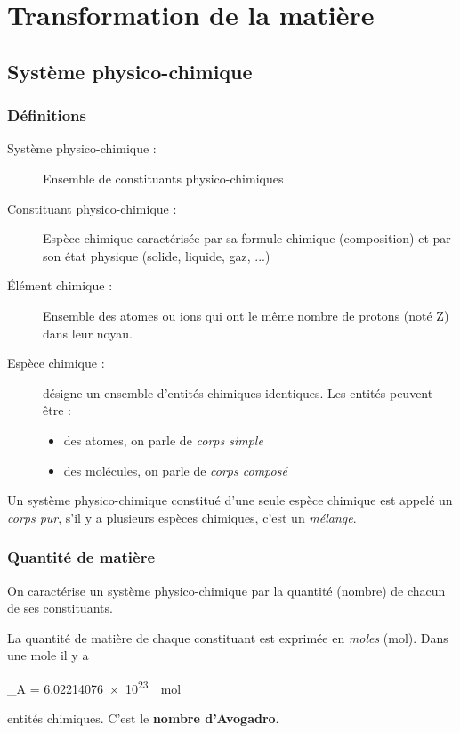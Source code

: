 \documentclass[MPSI]{cours}
\begin{document}
\setcounter{chapter}{2}
\chapter{Transformation de la matière}
\label{sub:transformation_de_la_matière}

\section{Système physico-chimique}%
\label{sec:systeme_physico_chimique}

\subsection{Définitions}%
\label{sub:definitions}

\begin{description}
  \item[Système physico-chimique : ] Ensemble de constituants physico-chimiques
  \item[Constituant physico-chimique : ] Espèce chimique caractérisée par sa formule chimique (composition) et par son état physique (solide, liquide, gaz, ...)
  \item[Élément chimique : ] Ensemble des atomes ou ions qui ont le même nombre de protons (noté Z) dans leur noyau.
  \item[Espèce chimique : ] désigne un ensemble d'entités chimiques identiques. Les entités peuvent être :
  \begin{itemize}
    \item des atomes, on parle de \emph{corps simple}
    \item des molécules, on parle de \emph{corps composé} 
  \end{itemize}
\end{description}

  Un système physico-chimique constitué d'une seule espèce chimique est appelé un \emph{corps pur}, s'il y a plusieurs espèces chimiques, c'est un \emph{mélange}.

\subsection{Quantité de matière}%
\label{sub:quantite_de_matiere}
On caractérise un système physico-chimique par la quantité (nombre) de chacun de ses constituants.

La quantité de matière de chaque constituant est exprimée en \emph{moles} (mol). Dans une mole il y a 
\begin{eqencadre}
  _A = \SI{6.02214076e23}{\per\mol}
\end{eqencadre}
entités chimiques. C'est le \textbf{nombre d'Avogadro}. 
\end{document}
